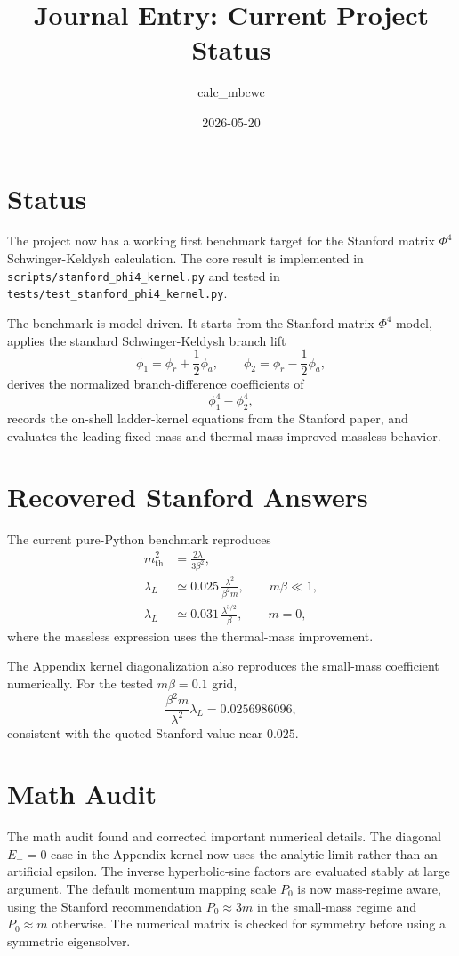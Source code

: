 \documentclass[11pt]{article}
\title{Journal Entry: Current Project Status}
\author{calc\_mbcwc}
\date{2026-05-20}
\begin{document}
\maketitle

\section*{Status}

The project now has a working first benchmark target for the Stanford matrix
\(\Phi^4\) Schwinger-Keldysh calculation. The core result is implemented in
\texttt{scripts/stanford\_phi4\_kernel.py} and tested in
\texttt{tests/test\_stanford\_phi4\_kernel.py}.

The benchmark is model driven. It starts from the Stanford matrix \(\Phi^4\)
model, applies the standard Schwinger-Keldysh branch lift
\[
  \phi_1 = \phi_r + \frac{1}{2}\phi_a,
  \qquad
  \phi_2 = \phi_r - \frac{1}{2}\phi_a,
\]
derives the normalized branch-difference coefficients of
\[
  \phi_1^4 - \phi_2^4,
\]
records the on-shell ladder-kernel equations from the Stanford paper, and
evaluates the leading fixed-mass and thermal-mass-improved massless behavior.

\section*{Recovered Stanford Answers}

The current pure-Python benchmark reproduces
\begin{align}
  m_{\mathrm{th}}^2 &= \frac{2\lambda}{3\beta^2},\\
  \lambda_L &\simeq 0.025\,\frac{\lambda^2}{\beta^2 m},
  \qquad m\beta \ll 1,\\
  \lambda_L &\simeq 0.031\,\frac{\lambda^{3/2}}{\beta},
  \qquad m = 0,
\end{align}
where the massless expression uses the thermal-mass improvement.

The Appendix kernel diagonalization also reproduces the small-mass coefficient
numerically. For the tested \(m\beta=0.1\) grid,
\[
  \frac{\beta^2 m}{\lambda^2}\lambda_L = 0.0256986096,
\]
consistent with the quoted Stanford value near \(0.025\).

\section*{Math Audit}

The math audit found and corrected important numerical details. The diagonal
\(E_-=0\) case in the Appendix kernel now uses the analytic limit rather than
an artificial epsilon. The inverse hyperbolic-sine factors are evaluated
stably at large argument. The default momentum mapping scale \(P_0\) is now
mass-regime aware, using the Stanford recommendation \(P_0 \approx 3m\) in the
small-mass regime and \(P_0 \approx m\) otherwise. The numerical matrix is
checked for symmetry before using a symmetric eigensolver.
\end{document}
